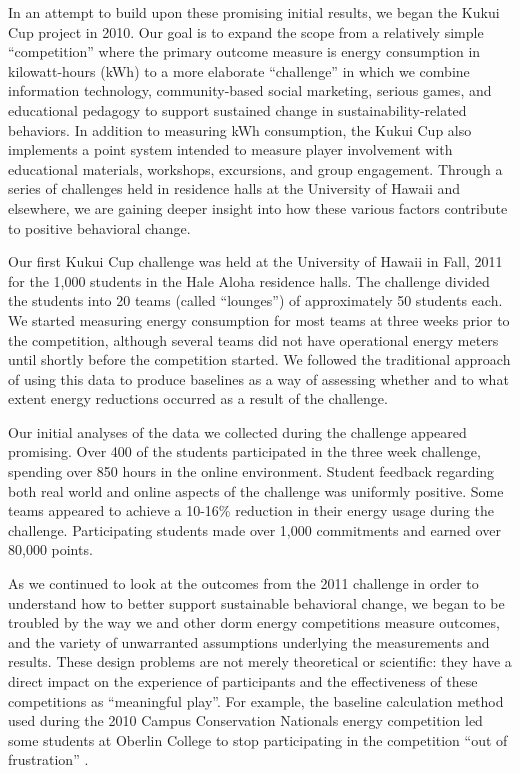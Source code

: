 \documentclass[jou]{apa} %
\begin{document}
In an attempt to build upon these promising initial results, we began the Kukui Cup
project in 2010.  Our goal is to expand the scope from a relatively simple ``competition''
where the primary outcome measure is energy consumption in kilowatt-hours (kWh) to a more
elaborate ``challenge'' in which we combine information technology, community-based social
marketing, serious games, and educational pedagogy to support sustained change in
sustainability-related behaviors.  In addition to measuring kWh consumption, the Kukui Cup
also implements a point system intended to measure player involvement with educational
materials, workshops, excursions, and group engagement.  Through a series of challenges
held in residence halls at the University of Hawaii and elsewhere, we are gaining
deeper insight into how these various factors contribute to positive behavioral change.

Our first Kukui Cup challenge was held at the University of Hawaii in Fall, 2011 for the
1,000 students in the Hale Aloha residence halls. The challenge divided the students into
20 teams (called ``lounges'') of approximately 50 students each.  We started measuring
energy consumption for most teams at three weeks prior to the competition, although
several teams did not have operational energy meters until shortly before the competition
started. We followed the traditional approach of using this data to produce baselines as a
way of assessing whether and to what extent energy reductions occurred as a result of the
challenge.

Our initial analyses of the data we collected during the challenge appeared promising.
Over 400 of the students participated in the three week challenge, spending over 850 hours
in the online environment.  Student feedback regarding both real world and online aspects
of the challenge was uniformly positive.  Some teams appeared to achieve a 10-16\%
reduction in their energy usage during the challenge.  Participating students made over
1,000 commitments and earned over 80,000 points.

As we continued to look at the outcomes from the 2011 challenge in order to understand
how to better support sustainable behavioral change, we began to be troubled by the way
we and other dorm energy competitions measure outcomes, and the variety of unwarranted
assumptions underlying the measurements and results.  These design problems
are not merely theoretical or scientific: they have a direct impact on the experience of
participants and the effectiveness of these competitions as ``meaningful play''.  For
example, the baseline calculation method used during the 2010 Campus Conservation
Nationals energy competition led some students at Oberlin College to stop participating in
the competition ``out of frustration'' \cite{Willens2010}.
\end{document}
